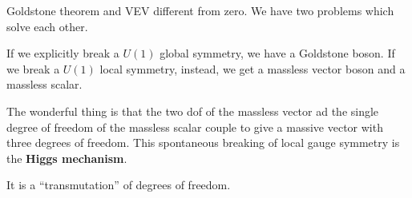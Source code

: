 \documentclass[main.tex]{subfiles}
\begin{document}

Goldstone theorem and VEV different from zero.
We have two problems which solve each other. 

If we explicitly break a \(U(1)\) global symmetry, we have a Goldstone boson. If we break a \(U(1)\) local symmetry, instead, we get a massless vector boson and a massless scalar.

The wonderful thing is that the two dof of the massless vector ad the single degree of freedom of the massless scalar couple to give a massive vector with three degrees of freedom.
This spontaneous breaking of local gauge symmetry is the \textbf{Higgs mechanism}.

It is a ``transmutation'' of degrees of freedom.
\end{document}
